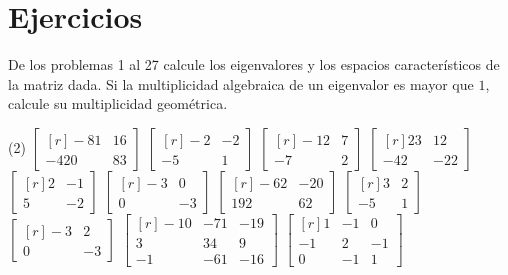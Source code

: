 \newpage

\section{Ejercicios}

\noindent
De los problemas 1 al 27 calcule los eigenvalores y los espacios característicos de la matriz dada. Si la multiplicidad algebraica de un eigenvalor es mayor que $1$, calcule su multiplicidad geométrica.
\begin{tasks}[
    style=enumerate,
    label-offset = 3mm,
    ](2)
    \task $\begin{bmatrix*}[r]-81 & 16 \\ -420 & 83\end{bmatrix*}$
    \task $\begin{bmatrix*}[r]-2 & -2 \\ -5 & 1\end{bmatrix*}$
    \task $\begin{bmatrix*}[r]-12 & 7 \\ -7 & 2\end{bmatrix*}$
    \task $\begin{bmatrix*}[r]23 & 12 \\ -42 & -22\end{bmatrix*}$
    \task $\begin{bmatrix*}[r]2 & -1 \\ 5 & -2\end{bmatrix*}$
    \task $\begin{bmatrix*}[r]-3 & 0 \\ 0 & -3\end{bmatrix*}$
    \task $\begin{bmatrix*}[r]-62 & -20 \\ 192 & 62\end{bmatrix*}$
    \task $\begin{bmatrix*}[r]3 & 2 \\ -5 & 1\end{bmatrix*}$
    \task $\begin{bmatrix*}[r]-3 & 2 \\ 0 & -3\end{bmatrix*}$
    \task $\begin{bmatrix*}[r]-10 & -71 & -19 \\ 3 & 34 & 9 \\ -1 & -61 & -16\end{bmatrix*}$
    \task $\begin{bmatrix*}[r]1 & -1 & 0 \\ -1 & 2 & -1 \\ 0 & -1 & 1\end{bmatrix*}$

\end{tasks}
